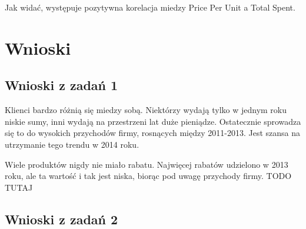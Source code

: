 \documentclass[a4paper,12pt]{article}
\begin{document}
Jak widać, występuje pozytywna korelacja miedzy Price Per Unit a Total Spent.

\section{Wnioski}

\subsection{Wnioski z zadań 1}

Klienci bardzo różnią się miedzy sobą. Niektórzy wydają tylko w jednym roku niskie sumy, inni wydają na przestrzeni lat duże pieniądze. Ostatecznie sprowadza się to do wysokich przychodów firmy, rosnących między 2011-2013. Jest szansa na utrzymanie tego trendu w 2014 roku.

Wiele produktów nigdy nie miało rabatu. Najwięcej rabatów udzielono w 2013 roku, ale ta wartość i tak jest niska, biorąc pod uwagę przychody firmy.
TODO TUTAJ

\subsection{Wnioski z zadań 2}



\printbibliography
\end{document}
